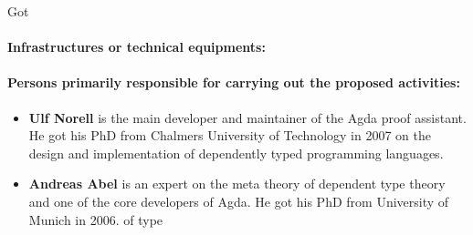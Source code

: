 \begin{sitedescription}{Got}
\paragraph{Infrastructures or technical equipments:}

\paragraph{Persons primarily responsible for carrying out the proposed activities:}

\begin{itemize}
\item{\bf Ulf Norell} is the main developer and maintainer of the Agda
proof assistant. He got his PhD from Chalmers University of Technology in
2007 on the design and implementation of dependently typed programming
languages.
\item{\bf Andreas Abel} is an expert on the meta theory of dependent type
theory and one of the core developers of Agda. He got his PhD from
University of Munich in 2006.
of type
\end{itemize}

\end{sitedescription}

